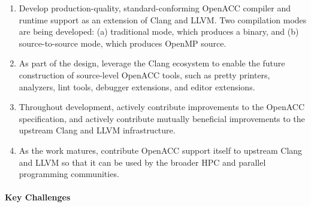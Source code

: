 \begin{enumerate}

\item Develop production-quality, standard-conforming OpenACC
compiler and runtime support as an extension of Clang and LLVM.  Two
compilation modes are being developed: (a) traditional mode, which
produces a binary, and (b) source-to-source mode, which produces
OpenMP source.

\item As part of the design, leverage the Clang ecosystem to enable
the future construction of source-level OpenACC tools, such as pretty
printers, analyzers, lint tools, debugger extensions, and editor
extensions.

\item Throughout development, actively contribute improvements to the
OpenACC specification, and actively contribute mutually beneficial
improvements to the upstream Clang and LLVM infrastructure.

\item As the work matures, contribute OpenACC support itself to
upstream Clang and LLVM so that it can be used by the broader HPC and
parallel programming communities.

\end{enumerate}

\paragraph{Key Challenges}

